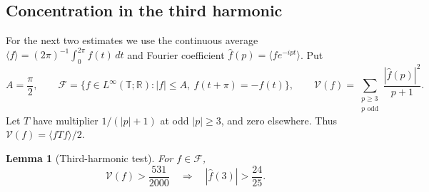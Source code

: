 \documentclass[11pt,reqno]{amsart}
\numberwithin{equation}{section}
\newtheorem{lemma}[theorem]{Lemma}
\theoremstyle{definition}
\theoremstyle{remark}
\newcommand{\R}{\mathbb R}
\newcommand{\T}{\mathbb T}
\newcommand{\V}{\mathcal V}
\newcommand{\ac}[1]{\langle #1\rangle}
\begin{document}
\subsection{Concentration in the third harmonic}
For the next two estimates we use the continuous average $\ac f=(2\pi)^{-1}\int_0^{2\pi}f(t)\,dt$ and Fourier coefficient $\widehat f(p)=\ac{fe^{-ipt}}$. Put
\[
 A=\frac\pi2,\qquad
 \mathcal F=\{f\in L^\infty(\T;\R):|f|\le A,\ f(t+\pi)=-f(t)\},
 \qquad
 \V(f)=\sum_{\substack{p\ge3\\p\text{ odd}}}\frac{|\widehat f(p)|^2}{p+1}.
\]
Let $T$ have multiplier $1/(|p|+1)$ at odd $|p|\ge3$, and zero elsewhere. Thus $\V(f)=\ac{fTf}/2$.

\begin{lemma}[Third-harmonic test]\label{lem:third-test}
For $f\in\mathcal F$,
\begin{equation}\label{eq:third-test}
 \V(f)>\frac{531}{2000}\quad\Longrightarrow\quad
 |\widehat f(3)|>\frac{24}{25}.
\end{equation}
\end{lemma}
\end{document}
